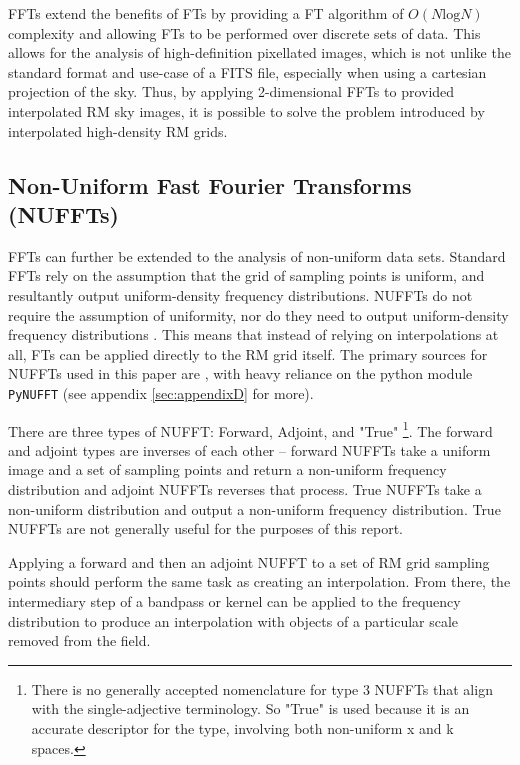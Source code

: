 FFTs extend the benefits of FTs by providing a FT algorithm of $O(N\mathrm{log}N)$ complexity and allowing FTs to be performed over discrete sets of data. This allows for the analysis of high-definition pixellated images, which is not unlike the standard format and use-case of a FITS file, especially when using a cartesian projection of the sky. Thus, by applying 2-dimensional FFTs to provided interpolated RM sky images, it is possible to solve the problem introduced by interpolated high-density RM grids.

\subsection{Non-Uniform Fast Fourier Transforms (NUFFTs)}
\label{ssec:nuffts}

FFTs can further be extended to the analysis of non-uniform data sets. Standard FFTs rely on the assumption that the grid of sampling points is uniform, and resultantly output uniform-density frequency distributions. NUFFTs do not require the assumption of uniformity, nor do they need to output uniform-density frequency distributions \citep{ID55, ID57}. This means that instead of relying on interpolations at all, FTs can be applied directly to the RM grid itself. The primary sources for NUFFTs used in this paper are \cite{ID55, ID57}, with heavy reliance on the python module \verb|PyNUFFT| (see appendix \ref{sec:appendixD} for more).


There are three types of NUFFT: Forward, Adjoint, and "True" \footnote{There is no generally accepted nomenclature for type 3 NUFFTs that align with the single-adjective terminology. So "True" is used because it is an accurate descriptor for the type, involving both non-uniform x and k spaces.}. The forward and adjoint types are inverses of each other – forward NUFFTs take a uniform image and a set of sampling points and return a non-uniform frequency distribution and adjoint NUFFTs reverses that process. True NUFFTs take a non-uniform distribution and output a non-uniform frequency distribution. True NUFFTs are not generally useful for the purposes of this report.


Applying a forward and then an adjoint NUFFT to a set of RM grid sampling points should perform the same task as creating an interpolation. From there, the intermediary step of a bandpass or kernel can be applied to the frequency distribution to produce an interpolation with objects of a particular scale removed from the field.


